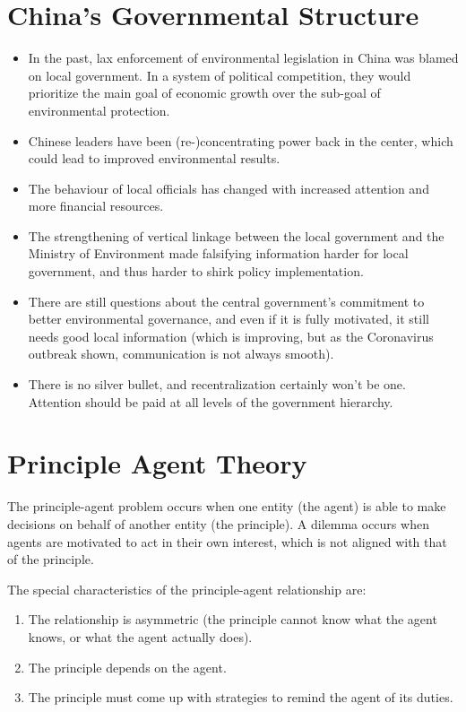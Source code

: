 \section{China's Governmental Structure}

\begin{itemize}
  \item In the past, lax enforcement of environmental legislation in
    China was blamed on local government. In a system of political
    competition, they would prioritize the main goal of economic
    growth over the sub-goal of environmental protection.
  \item Chinese leaders have been (re-)concentrating power back in the
    center, which could lead to improved environmental results.
  \item The behaviour of local officials has changed with increased
    attention and more financial resources.
  \item The strengthening of vertical linkage between the local
    government and the Ministry of Environment made falsifying
    information harder for local government, and thus harder to shirk
    policy implementation.
  \item There are still questions about the central government's
    commitment to better environmental governance, and even if it is
    fully motivated, it still needs good local information (which is
    improving, but as the Coronavirus outbreak shown, communication is
    not always smooth).
  \item There is no silver bullet, and recentralization certainly
    won't be one. Attention should be paid at all levels of the
    government hierarchy.
\end{itemize}

\section{Principle Agent Theory}

The principle-agent problem occurs when one entity (the agent) is able
to make decisions on behalf of another entity (the principle). A
dilemma occurs when agents are motivated to act in their own
interest, which is not aligned with that of the principle.

The special characteristics of the principle-agent relationship are:
\begin{enumerate}
  \item The relationship is asymmetric (the principle cannot know what
    the agent knows, or what the agent actually does).
  \item The principle depends on the agent.
  \item The principle must come up with strategies to remind the agent
    of its duties.
\end{enumerate}

